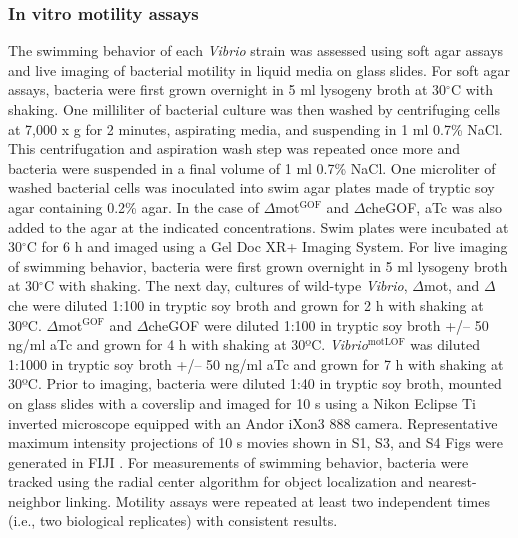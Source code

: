 \subsubsection{In vitro motility assays}
The swimming behavior of each \textit{Vibrio} strain was assessed using soft agar assays and live imaging of bacterial motility in liquid media on glass slides. For soft agar assays, bacteria were first grown overnight in 5 ml lysogeny broth at 30$^\circ$C with shaking. One milliliter of bacterial culture was then washed by centrifuging cells at 7,000 x g for 2 minutes, aspirating media, and suspending in 1 ml 0.7\% NaCl. This centrifugation and aspiration wash step was repeated once more and bacteria were suspended in a final volume of 1 ml 0.7\% NaCl. One microliter of washed bacterial cells was inoculated into swim agar plates made of tryptic soy agar containing 0.2\% agar. In the case of $\Delta$mot$^{\text{GOF}}$ and $\Delta$cheGOF, aTc was also added to the agar at the indicated concentrations. Swim plates were incubated at 30$^\circ$C for 6 h and imaged using a Gel Doc XR+ Imaging System. For live imaging of swimming behavior, bacteria were first grown overnight in 5 ml lysogeny broth at 30$^\circ$C with shaking. The next day, cultures of wild-type \textit{Vibrio}, $\Delta$mot, and $\Delta$che were diluted 1:100 in tryptic soy broth and grown for 2 h with shaking at 30ºC. $\Delta$mot$^{\text{GOF}}$ and $\Delta$cheGOF were diluted 1:100 in tryptic soy broth +/– 50 ng/ml aTc and grown for 4 h with shaking at 30ºC. \textit{Vibrio}$^{\text{motLOF}}$ was diluted 1:1000 in tryptic soy broth +/– 50 ng/ml aTc and grown for 7 h with shaking at 30ºC. Prior to imaging, bacteria were diluted 1:40 in tryptic soy broth, mounted on glass slides with a coverslip and imaged for 10 s using a Nikon Eclipse Ti inverted microscope equipped with an Andor iXon3 888 camera. Representative maximum intensity projections of 10 s movies shown in S1, S3, and S4 Figs were generated in FIJI \cite{schindelin_fiji_2012}. For measurements of swimming behavior, bacteria were tracked using the radial center algorithm \cite{parthasarathy_rapid_2012} for object localization and nearest-neighbor linking. Motility assays were repeated at least two independent times (i.e., two biological replicates) with consistent results. 

